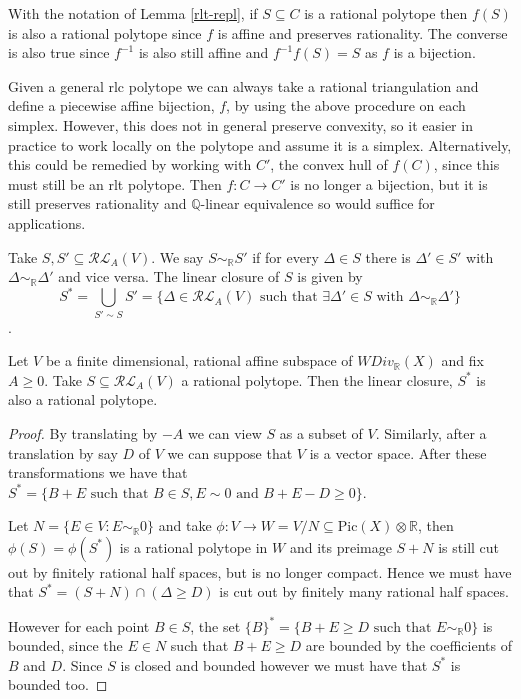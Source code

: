 \documentclass[a4paper,12pt]{amsart}
\begin{document}
\begin{remark}
	With the notation of Lemma \ref{rlt-repl}, if $S \subseteq C$ is a rational polytope then $f(S)$ is also a rational polytope since $f$ is affine and preserves rationality. The converse is also true since $f^{-1}$ is also still affine and $f^{-1}f(S)=S$ as $f$ is a bijection.  
\end{remark}


	Given a general rlc polytope we can always take a rational triangulation and define a piecewise affine bijection, $f$, by using the above procedure on each simplex. However, this does not in general preserve convexity, so it easier in practice to work locally on the polytope and assume it is a simplex. Alternatively, this could be remedied by working with $C'$, the convex hull of $f(C)$, since this must still be an rlt polytope. Then $f\colon C \to C'$ is no longer a bijection, but it is still preserves rationality and $\mathbb{Q}$-linear equivalence so would suffice for applications. 

	
	\begin{definition}
		Take $S, S' \subseteq \mathcal{RL}_{A}(V)$. We say $S \sim_{\mathbb{R}} S'$ if for every $\Delta \in S$ there is $\Delta' \in S'$ with $\Delta \sim_{\mathbb{R}} \Delta'$ and vice versa. The linear closure of $S$ is given by $$S^{*}=\bigcup_{S' \sim S}S'= \{\Delta \in \mathcal{RL}_{A}(V) \text{ such that } \exists \Delta' \in S \text{ with }\Delta \sim_{\mathbb{R}} \Delta'\}$$.
	\end{definition}
	
	

	\begin{lemma}
		Let $V$ be a finite dimensional, rational affine subspace of $WDiv_{\mathbb{R}}(X)$ and fix $A \geq 0$. Take $S \subseteq \mathcal{RL}_{A}(V)$ a rational polytope. Then the linear closure, $S^{*}$ is also a rational polytope. 
	\end{lemma}
	
	\begin{proof}
		By translating by $-A$ we can view $S$ as a subset of $V$. Similarly, after a translation by say $D$ of $V$ we can suppose that $V$ is a vector space. After these transformations we have that $S^{*}=\{B+E \text{ such that } B\in S, E \sim 0 \text{ and } B+E -D \geq 0\}$.
		
		
		Let $N=\{E \in V: E \sim_{\mathbb{R}} 0\}$ and take $\phi:V \to W=V/N \subseteq \text{Pic}(X)\otimes \mathbb{R}$, then $\phi(S)=\phi(S^{*})$ is a rational polytope in $W$ and its preimage $S+N$ is still cut out by finitely rational half spaces, but is no longer compact. Hence we must have that $S^{*}=(S+N)\cap({\Delta \geq D})$ is cut out by finitely many rational half spaces. 
		
		However for each point $B \in S$, the set $\{B\}^{*}=\{B+E\geq D \text{ such that } E \sim_{\mathbb{R}} 0\}$ is bounded, since the $E\in N$ such that $B+E \geq D$ are bounded by the coefficients of $B$ and $D$. Since $S$ is closed and bounded however we must have that $S^{*}$ is bounded too.
	\end{proof}
	
\end{document}
